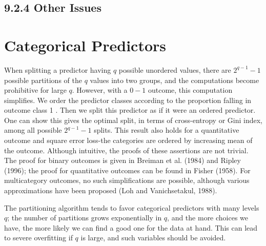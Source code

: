 \documentclass[10pt]{article}
\begin{document}
\subsection*{9.2.4 Other Issues}
\section*{Categorical Predictors}
When splitting a predictor having $q$ possible unordered values, there are $2^{q-1}-1$ possible partitions of the $q$ values into two groups, and the computations become prohibitive for large $q$. However, with a $0-1$ outcome, this computation simplifies. We order the predictor classes according to the proportion falling in outcome class 1 . Then we split this predictor as if it were an ordered predictor. One can show this gives the optimal split, in terms of cross-entropy or Gini index, among all possible $2^{q-1}-1$ splits. This result also holds for a quantitative outcome and square error loss-the categories are ordered by increasing mean of the outcome. Although intuitive, the proofs of these assertions are not trivial. The proof for binary outcomes is given in Breiman et al. (1984) and Ripley (1996); the proof for quantitative outcomes can be found in Fisher (1958). For multicategory outcomes, no such simplifications are possible, although various approximations have been proposed (Loh and Vanichsetakul, 1988).

The partitioning algorithm tends to favor categorical predictors with many levels $q$; the number of partitions grows exponentially in $q$, and the more choices we have, the more likely we can find a good one for the data at hand. This can lead to severe overfitting if $q$ is large, and such variables should be avoided.
\end{document}
